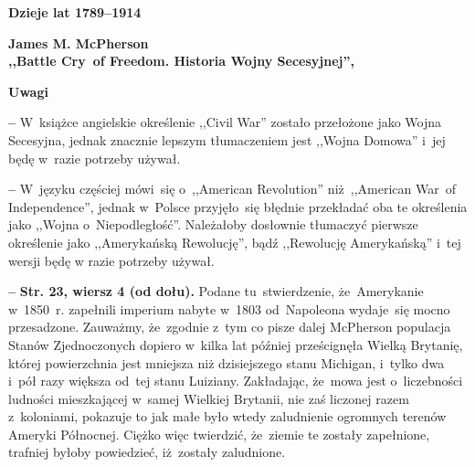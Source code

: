 \documentclass[a4paper,11pt]{article}  %
\newcommand{\spaceTwo}{2em}
\newcommand{\spaceThree}{1em}
\newcommand{\spaceFour}{0.5em}
\newcommand{\tb}{\textbf}
\newcommand{\noi}{\noindent}
\newcommand{\start}{\noi \tb{--} {}}
\newcommand{\StrWd}[2]{\tb{Str. #1, wiersz #2 (od dołu).}}
\newcommand{\Center}[1]{\begin{center} #1 \end{center}}
\newcommand{\CenterTB}[1]{\Center{\tb{#1}}}
\newcommand{\Field}[1]{ \begin{center} {\Large \tb{#1} } \end{center} }
\newcommand{\Work}[1]{ \begin{center} {\large \tb{#1}} \end{center} }
\begin{document}
\vspace{\spaceTwo}















\newpage
\Field{Dzieje lat 1789--1914}

\vspace{\spaceTwo} \vspace{\spaceThree}



\Work{
  James M. McPherson \\
  ,,Battle Cry~of Freedom. Historia Wojny Secesyjnej'',
  \cite{McPhersonBattleCryOfFreedom16} }


\CenterTB{Uwagi}

\start W~książce angielskie określenie ,,Civil War'' zostało
przełożone jako Wojna Secesyjna, jednak znacznie lepszym tłumaczeniem
jest ,,Wojna Domowa'' i~jej będę w~razie potrzeby używał.

\vspace{\spaceFour}


\start W~języku częściej mówi~się o~,,American Revolution''
niż~,,American War~of Independence'', jednak w~Polsce przyjęło~się
błędnie przekładać oba te określenia jako ,,Wojna o~Niepodległość''.
Należałoby dosłownie tłumaczyć pierwsze określenie jako ,,Amerykańską
Rewolucję'', bądź ,,Rewolucję Amerykańską'' i~tej wersji będę w razie
potrzeby używał.

\vspace{\spaceFour}


\start \StrWd{23}{4} Podane tu~stwierdzenie, że~Amerykanie w~1850~r.
zapełnili imperium nabyte w~1803 od~Napoleona wydaje~się mocno
przesadzone. Zauważmy, że~zgodnie z~tym co pisze dalej McPherson
populacja Stanów Zjednoczonych dopiero w~kilka lat później
prześcignęła Wielką Brytanię, której powierzchnia jest mniejsza niż
dzisiejszego stanu Michigan, i~tylko dwa i~pół razy większa od~tej
stanu Luiziany. Zakładając, że~mowa jest o~liczebności ludności
mieszkającej w~samej Wielkiej Brytanii, nie zaś liczonej razem
z~koloniami, pokazuje to jak małe było wtedy zaludnienie ogromnych
terenów Ameryki Północnej. Ciężko więc twierdzić, że~ziemie te zostały
zapełnione, trafniej byłoby powiedzieć, iż~zostały zaludnione.
\end{document}
